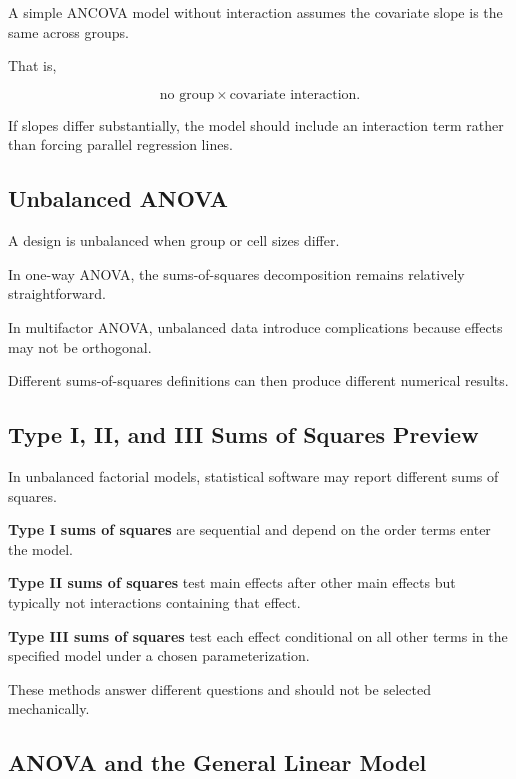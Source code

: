 A simple ANCOVA model without interaction assumes the covariate slope is
the same across groups.

That is,

\[
\boxed{
\text{no group}\times\text{covariate interaction}.
}
\]

If slopes differ substantially, the model should include an interaction
term rather than forcing parallel regression lines.

\subsection{Unbalanced ANOVA}
\label{subsec:unbalanced-anova}

A design is unbalanced when group or cell sizes differ.

In one-way ANOVA, the sums-of-squares decomposition remains relatively
straightforward.

In multifactor ANOVA, unbalanced data introduce complications because
effects may not be orthogonal.

Different sums-of-squares definitions can then produce different
numerical results.

\subsection{Type I, II, and III Sums of Squares Preview}
\label{subsec:type-sums-of-squares}

In unbalanced factorial models, statistical software may report
different sums of squares.

\textbf{Type I sums of squares} are sequential and depend on the order
terms enter the model.

\textbf{Type II sums of squares} test main effects after other main
effects but typically not interactions containing that effect.

\textbf{Type III sums of squares} test each effect conditional on all
other terms in the specified model under a chosen parameterization.

These methods answer different questions and should not be selected
mechanically.

\subsection{ANOVA and the General Linear Model}
\label{subsec:anova-general-linear-model}

